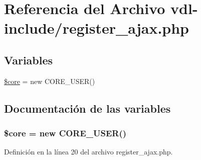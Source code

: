 \hypertarget{register__ajax_8php}{\section{Referencia del Archivo vdl-\/include/register\-\_\-ajax.php}
\label{register__ajax_8php}
}
\subsection*{Variables}
\begin{DoxyCompactItemize}
\item 
\hyperlink{register__ajax_8php_aa432de3bacb7ced3632fa0ee0269ada3}{\$core} = new C\-O\-R\-E\-\_\-\-U\-S\-E\-R()
\end{DoxyCompactItemize}


\subsection{Documentación de las variables}
\hypertarget{register__ajax_8php_aa432de3bacb7ced3632fa0ee0269ada3}{
\subsubsection[{\$core}]{\setlength{\rightskip}{0pt plus 5cm}\$core = new C\-O\-R\-E\-\_\-\-U\-S\-E\-R()}}\label{register__ajax_8php_aa432de3bacb7ced3632fa0ee0269ada3}


Definición en la línea 20 del archivo register\-\_\-ajax.\-php.

